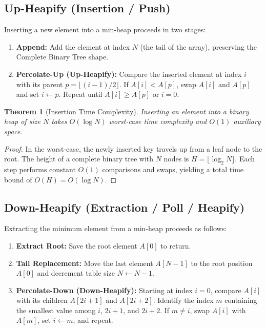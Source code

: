 \documentclass[10pt,journal,compsoc,onecolumn]{IEEEtran}
\newtheorem{theorem}{Theorem}
\begin{document}
\subsection{Up-Heapify (Insertion / Push)}
Inserting a new element into a min-heap proceeds in two stages:
\begin{enumerate}
    \item \textbf{Append:} Add the element at index $N$ (the tail of the array), preserving the Complete Binary Tree shape.
    \item \textbf{Percolate-Up (Up-Heapify):} Compare the inserted element at index $i$ with its parent $p = \lfloor (i-1)/2 \rfloor$. If $A[i] < A[p]$, swap $A[i]$ and $A[p]$ and set $i \leftarrow p$. Repeat until $A[i] \ge A[p]$ or $i = 0$.
\end{enumerate}

\begin{theorem}[Insertion Time Complexity]
Inserting an element into a binary heap of size $N$ takes $O(\log N)$ worst-case time complexity and $O(1)$ auxiliary space.
\end{theorem}
\begin{proof}
In the worst-case, the newly inserted key travels up from a leaf node to the root. The height of a complete binary tree with $N$ nodes is $H = \lfloor \log_2 N \rfloor$. Each step performs constant $O(1)$ comparisons and swaps, yielding a total time bound of $O(H) = O(\log N)$.
\end{proof}

\subsection{Down-Heapify (Extraction / Poll / Heapify)}
Extracting the minimum element from a min-heap proceeds as follows:
\begin{enumerate}
    \item \textbf{Extract Root:} Save the root element $A[0]$ to return.
    \item \textbf{Tail Replacement:} Move the last element $A[N-1]$ to the root position $A[0]$ and decrement table size $N \leftarrow N-1$.
    \item \textbf{Percolate-Down (Down-Heapify):} Starting at index $i=0$, compare $A[i]$ with its children $A[2i+1]$ and $A[2i+2]$. Identify the index $m$ containing the smallest value among $i$, $2i+1$, and $2i+2$. If $m \neq i$, swap $A[i]$ with $A[m]$, set $i \leftarrow m$, and repeat.
\end{enumerate}
\end{document}
